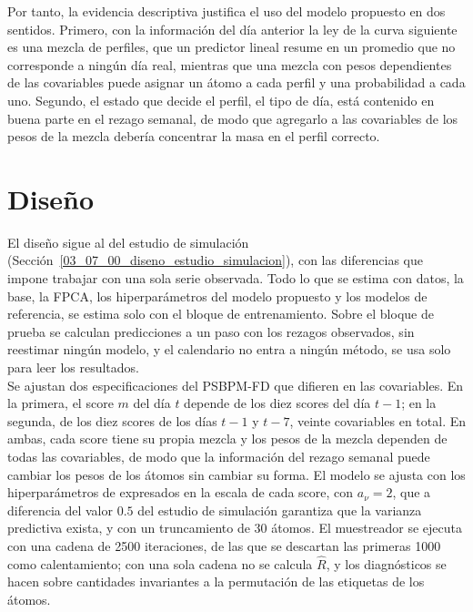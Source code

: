 Por tanto, la evidencia descriptiva justifica el uso del modelo propuesto en dos sentidos. Primero, con la información del día anterior la ley de la curva siguiente es una mezcla de perfiles, que un predictor lineal resume en un promedio que no corresponde a ningún día real, mientras que una mezcla con pesos dependientes de las covariables puede asignar un átomo a cada perfil y una probabilidad a cada uno. Segundo, el estado que decide el perfil, el tipo de día, está contenido en buena parte en el rezago semanal, de modo que agregarlo a las covariables de los pesos de la mezcla debería concentrar la masa en el perfil correcto.

\section{Diseño}
\label{04_02_00_diseno}

El diseño sigue al del estudio de simulación (Sección~\ref{03_07_00_diseno_estudio_simulacion}), con las diferencias que impone trabajar con una sola serie observada. Todo lo que se estima con datos, la base, la FPCA, los hiperparámetros del modelo propuesto y los modelos de referencia, se estima solo con el bloque de entrenamiento. Sobre el bloque de prueba se calculan predicciones a un paso con los rezagos observados, sin reestimar ningún modelo, y el calendario no entra a ningún método, se usa solo para leer los resultados.\\

Se ajustan dos especificaciones del PSBPM-FD que difieren en las covariables. En la primera, el score $m$ del día $t$ depende de los diez scores del día $t-1$; en la segunda, de los diez scores de los días $t-1$ y $t-7$, veinte covariables en total. En ambas, cada score tiene su propia mezcla y los pesos de la mezcla dependen de todas las covariables, de modo que la información del rezago semanal puede cambiar los pesos de los átomos sin cambiar su forma. El modelo se ajusta con los hiperparámetros de \citet{03_02_chung2009nonparametric} expresados en la escala de cada score, con $a_\nu = 2$, que a diferencia del valor $0.5$ del estudio de simulación garantiza que la varianza predictiva exista, y con un truncamiento de 30 átomos. El muestreador se ejecuta con una cadena de 2500 iteraciones, de las que se descartan las primeras 1000 como calentamiento; con una sola cadena no se calcula $\widehat{R}$, y los diagnósticos se hacen sobre cantidades invariantes a la permutación de las etiquetas de los átomos.\\

